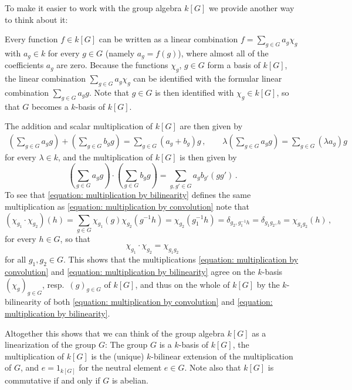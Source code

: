 \begin{fluff}
  To make it easier to work with the group algebra $k[G]$ we provide another way to think about it:

  Every function $f \in k[G]$ can be written as a linear combination $f = \sum_{g \in G} a_g \chi_g$ with $a_g \in k$ for every $g \in G$ (namely $a_g = f(g)$), where almost all of the coefficients $a_g$ are zero.
  Because the functions $\chi_g$, $g \in G$ form a basis of $k[G]$, the linear combination $\sum_{g \in G} a_g \chi_g$ can be identified with the formular linear combination $\sum_{g \in G} a_g g$.
  Note that $g \in G$ is then identified with $\chi_g \in k[G]$, so that $G$ becomes a $k$-basis of $k[G]$.
  
  The addition and scalar multiplication of $k[G]$ are then given by
  \begin{gather*}
        \left( \sum_{g \in G} a_g g \right)
      + \left( \sum_{g \in G} b_g g \right)
    = \sum_{g \in G} (a_g + b_g) g \,,
    \qquad
      \lambda \left( \sum_{g \in G} a_g g \right)
    = \sum_{g \in G} (\lambda a_g) g
  \end{gather*}
  for every $\lambda \in k$, and the multiplication of $k[G]$ is then given by
  \begin{equation}
  \label{equation: multiplication by bilinearity}
            \left( \sum_{g \in G} a_g g \right)
      \cdot \left( \sum_{g \in G} b_g g \right)
    = \sum_{g, g' \in G} a_g b_{g'} (g g') \,.
  \end{equation}
  To see that \eqref{equation: multiplication by bilinearity} defines the same multiplication as \eqref{equation: multiplication by convolution} note that
  \[
      \left( \chi_{g_1} \cdot \chi_{g_2} \right)(h)
    = \sum_{g \in G} \chi_{g_1}(g) \chi_{g_2}\left( g^{-1} h \right)
    = \chi_{g_2}\left( g_1^{-1}h \right)
    = \delta_{g_2, g_1^{-1} h}
    = \delta_{g_1 g_2, h}
    = \chi_{g_1 g_2}(h) \,,
  \]
  for every $h \in G$, so that
  \[
    \chi_{g_1} \cdot \chi_{g_2} = \chi_{g_1 g_2}
  \]
  for all $g_1, g_2 \in G$.
  This shows that the multiplications \eqref{equation: multiplication by convolution} and \eqref{equation: multiplication by bilinearity} agree on the $k$-basis $(\chi_g)_{g \in G}$, resp.\ $(g)_{g \in G}$ of $k[G]$, and thus on the whole of $k[G]$ by the $k$-bilinearity of both \eqref{equation: multiplication by convolution} and \eqref{equation: multiplication by bilinearity}.

  Altogether this shows that we can think of the group algebra $k[G]$ as a linearization of the group $G$:
  The group $G$ is a $k$-basis of $k[G]$, the multiplication of $k[G]$ is the (unique) $k$-bilinear extension of the multiplication of $G$, and $e = 1_{k[G]}$ for the neutral element $e \in G$.
  Note also that $k[G]$ is commutative if and only if $G$ is abelian.
\end{fluff}


